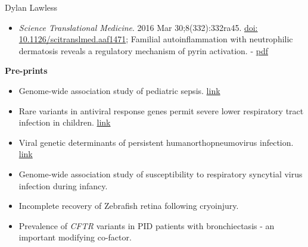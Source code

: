 \documentclass[11pt,a4paper]{article}
\begin{document}
\begin{cv}{Dylan Lawless}
\begin{itemize}[leftmargin=*]
\item \emph{Science Translational Medicine}. 2016 Mar 30;8(332):332ra45. 
\href{https://doi.org/10.1126/scitranslmed.aaf1471}{doi: 10.1126/scitranslmed.aaf1471};
Familial autoinflammation with neutrophilic dermatosis reveals a regulatory mechanism of pyrin activation.
- \href{https://lawlessgenomics.com/resume/pdf/2016MastersScienceTM_Familial\%20autoinflammation\%20with\%20neutrophilic\%20dermatosis\%20reveals\%20a\%20regulatory\%20mechanism\%20of\%20pyrin\%20activation\%20-\%20Science\%20Translational\%20Medicine.pdf}{pdf}

\end{itemize}
\textbf{Pre-prints}

\begin{itemize}[leftmargin=*]
\item Genome-wide association study of pediatric sepsis. 
\href{https://www.overleaf.com/project/61eff91e8fa2f73ce275d18d}{link} 

\item Rare variants in antiviral response genes permit severe lower respiratory tract infection in children. 
\href{https://www.overleaf.com/project/61e671c889b3851c7165a794}{link} 

\item Viral genetic determinants of persistent humanorthopneumovirus infection. 
\href{https://www.overleaf.com/project/61718a4e077acc3d20ee68f1}{link} 

\item Genome-wide association study of susceptibility to respiratory syncytial virus infection during infancy.

\item Incomplete recovery of Zebrafish retina following cryoinjury. 

\item Prevalence of \textit{CFTR} variants in PID patients with bronchiectasis - an important modifying co-factor.
\end{itemize}


\end{cv}
\end{document}
